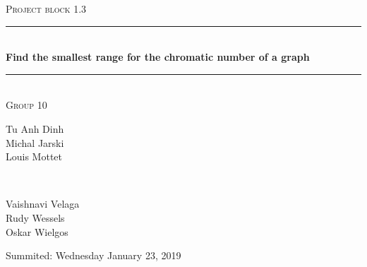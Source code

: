 \documentclass[a4paper]{report}
\begin{document}
	\begin{titlepage} 
		\newcommand{\HRule}{\rule{\linewidth}{0.5mm}}
		
		\center 
		
		\textsc{\large Project block 1.3}\\[0.5cm] 
		
		\HRule\\[0.4cm]
		
		{\huge\bfseries Find the smallest range for the chromatic number of a graph}\\[0.4cm] 
		
		\HRule\\[1.5cm]
		
		\textsc{\large Group 10}\\[0.5cm]

		\begin{minipage}{0.6\textwidth}
			\begin{flushleft}
				Tu Anh Dinh\\Michal Jarski\\Louis Mottet
			\end{flushleft}
		\end{minipage}
		~
		\begin{minipage}{0.3\textwidth}
			\begin{flushleft}
				Vaishnavi Velaga\\Rudy Wessels\\Oskar Wielgos
			\end{flushleft}
		\end{minipage}
		
		\vspace{2cm}
		
		Summited: Wednesday January 23, 2019
		
		
	\end{titlepage}
	
	
	
	
	
\end{document}
